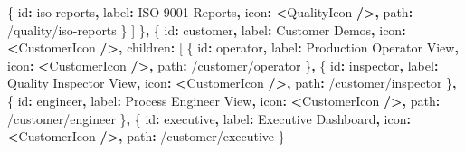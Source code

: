 \documentclass[
]{article}
\newenvironment{Shaded}{\begin{snugshade}}{\end{snugshade}}
\newcommand{\NormalTok}[1]{#1}
\newcommand{\OperatorTok}[1]{\textcolor[rgb]{0.81,0.36,0.00}{\textbf{#1}}}
\newcommand{\StringTok}[1]{\textcolor[rgb]{0.31,0.60,0.02}{#1}}
\begin{document}
\begin{Shaded}
\begin{Highlighting}[]
\NormalTok{      \{ id}\OperatorTok{:} \StringTok{\textquotesingle{}iso{-}reports\textquotesingle{}}\OperatorTok{,}\NormalTok{ label}\OperatorTok{:} \StringTok{\textquotesingle{}ISO 9001 Reports\textquotesingle{}}\OperatorTok{,}\NormalTok{ icon}\OperatorTok{:} \OperatorTok{\textless{}}\NormalTok{QualityIcon }\OperatorTok{/\textgreater{},}\NormalTok{ path}\OperatorTok{:} \StringTok{\textquotesingle{}/quality/iso{-}reports\textquotesingle{}}\NormalTok{ \}}
\NormalTok{    ]}
\NormalTok{  \}}\OperatorTok{,}
\NormalTok{  \{}
\NormalTok{    id}\OperatorTok{:} \StringTok{\textquotesingle{}customer\textquotesingle{}}\OperatorTok{,}
\NormalTok{    label}\OperatorTok{:} \StringTok{\textquotesingle{}Customer Demos\textquotesingle{}}\OperatorTok{,}
\NormalTok{    icon}\OperatorTok{:} \OperatorTok{\textless{}}\NormalTok{CustomerIcon }\OperatorTok{/\textgreater{},}
\NormalTok{    children}\OperatorTok{:}\NormalTok{ [}
\NormalTok{      \{ id}\OperatorTok{:} \StringTok{\textquotesingle{}operator\textquotesingle{}}\OperatorTok{,}\NormalTok{ label}\OperatorTok{:} \StringTok{\textquotesingle{}Production Operator View\textquotesingle{}}\OperatorTok{,}\NormalTok{ icon}\OperatorTok{:} \OperatorTok{\textless{}}\NormalTok{CustomerIcon }\OperatorTok{/\textgreater{},}\NormalTok{ path}\OperatorTok{:} \StringTok{\textquotesingle{}/customer/operator\textquotesingle{}}\NormalTok{ \}}\OperatorTok{,}
\NormalTok{      \{ id}\OperatorTok{:} \StringTok{\textquotesingle{}inspector\textquotesingle{}}\OperatorTok{,}\NormalTok{ label}\OperatorTok{:} \StringTok{\textquotesingle{}Quality Inspector View\textquotesingle{}}\OperatorTok{,}\NormalTok{ icon}\OperatorTok{:} \OperatorTok{\textless{}}\NormalTok{CustomerIcon }\OperatorTok{/\textgreater{},}\NormalTok{ path}\OperatorTok{:} \StringTok{\textquotesingle{}/customer/inspector\textquotesingle{}}\NormalTok{ \}}\OperatorTok{,}
\NormalTok{      \{ id}\OperatorTok{:} \StringTok{\textquotesingle{}engineer\textquotesingle{}}\OperatorTok{,}\NormalTok{ label}\OperatorTok{:} \StringTok{\textquotesingle{}Process Engineer View\textquotesingle{}}\OperatorTok{,}\NormalTok{ icon}\OperatorTok{:} \OperatorTok{\textless{}}\NormalTok{CustomerIcon }\OperatorTok{/\textgreater{},}\NormalTok{ path}\OperatorTok{:} \StringTok{\textquotesingle{}/customer/engineer\textquotesingle{}}\NormalTok{ \}}\OperatorTok{,}
\NormalTok{      \{ id}\OperatorTok{:} \StringTok{\textquotesingle{}executive\textquotesingle{}}\OperatorTok{,}\NormalTok{ label}\OperatorTok{:} \StringTok{\textquotesingle{}Executive Dashboard\textquotesingle{}}\OperatorTok{,}\NormalTok{ icon}\OperatorTok{:} \OperatorTok{\textless{}}\NormalTok{CustomerIcon }\OperatorTok{/\textgreater{},}\NormalTok{ path}\OperatorTok{:} \StringTok{\textquotesingle{}/customer/executive\textquotesingle{}}\NormalTok{ \}}

\end{Highlighting}
\end{Shaded}
\end{document}
